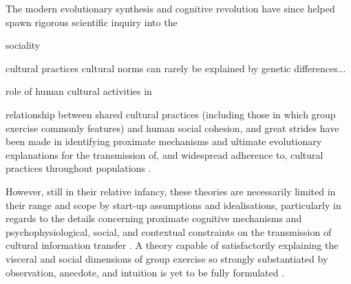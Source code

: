 The modern evolutionary synthesis and cognitive revolution have since helped spawn rigorous scientific inquiry into the

sociality

cultural practices
cultural norms can rarely be explained by genetic differences...

 role of human cultural activities in

 relationship between shared cultural practices (including those in which group exercise commonly features) and human social cohesion, and great strides have been made in identifying proximate mechanisms and ultimate evolutionary explanations for the transmission of, and widespread adherence to, cultural practices throughout populations \citep{Dawkins1976,Boyd1988,Sperber1996,Barrett2002,Whitehouse2004,Whitehouse2014,Henrich2007}.

 However, still in their relative infancy, these theories are necessarily limited in their range and scope by start-up assumptions and idealisations, particularly in regards to the details concerning proximate cognitive mechanisms and psychophysiological, social, and contextual constraints on the transmission of cultural information transfer \citep{Sperber1996,Dunbar2012,Claidiere2014}. A theory capable of satisfactorily explaining the visceral and social dimensions of group exercise so strongly substantiated by observation, anecdote, and intuition is yet to be fully formulated \citep{Cohen2017}.


